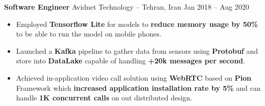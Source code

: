 \textbf{Software Engineer} Avidnet Technology -- Tehran, Iran \hfill Jan 2018 -- Aug 2020
\vspace{-10pt}
\begin{itemize}
      \item Employed \textbf{Tensorflow Lite} for models to \textbf{reduce memory usage by 50\%} to be able to run the model on mobile phones.
      \item Launched a \textbf{Kafka} pipeline to gather data from sensors using \textbf{Protobuf}
            and store into \textbf{DataLake} capable of handling \textbf{+20k messages per second}.
      \item Achieved in-application video call solution using \textbf{WebRTC} based on \textbf{Pion}
            Framework which \textbf{increased application installation rate by 5\%} and can
            handle \textbf{1K concurrent calls} on out distributed design.
\end{itemize}
